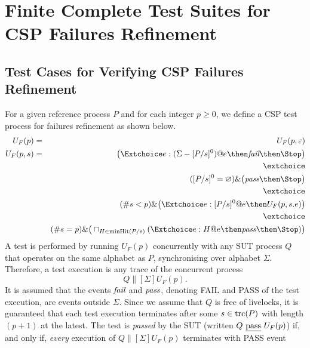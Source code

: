 \section{Finite Complete Test Suites for CSP Failures Refinement}
\label{sec:finitecompletefails}


\subsection{Test Cases for Verifying CSP Failures Refinement}

For a given reference process $P$ and for each integer $p\ge 0$, we define a
CSP test process for failures refinement as shown below.
%
\begin{eqnarray}
U_F(p) & = & U_F(p,\varepsilon)
\\
U_F(p,s) & = & \big( \Extchoice e:(\Sigma - [P/s]^0) @ e \then \efail\then \Stop \big)
\label{eq:ufa}
\\ & & \extchoice \nonumber
\\ & & ([P/s]^0 = \varnothing)    \&   \big( \epass \then \Stop \big)
\label{eq:ufb}
\\ & & \extchoice \nonumber
\\ & & (\#s < p) \& \big( \Extchoice e:[P/s]^0 @ e \then U_F(p,s.e) \big)
\label{eq:ufc}
\\ & & \extchoice \nonumber
\\ & & (\#s = p) \& \big( \sqcap_{H\in\text{minHit}(P/s)} ( \Extchoice e:H @ e \then \epass \then\Stop   )  \big)
\label{eq:ufd}
\end{eqnarray}
%
A test is performed by running $U_F(p)$ concurrently with any SUT process $Q$
 that operates on the same alphabet as $P$,
synchronising over alphabet $\Sigma$. Therefore, a test execution is any
trace of the concurrent process
\[
Q\parallel[\Sigma] U_F(p).
\]
It is assumed that the events ${\text{\it fail}}$ and ${\text{\it pass}}$, denoting FAIL and PASS
of the test execution, are events outside $\Sigma$. Since we assume that $Q$
is free of livelocks, it is guaranteed that each test execution terminates
after some $s\in\text{trc}(P)$ with length $(p+1)$ at the latest. The test is
\emph{passed} by the SUT (written $Q\ \underline{\text{pass}}\ U_F(p)$) if, and only if, {\it
every} execution of $Q\parallel[\Sigma] U_F(p)$ terminates with PASS event
